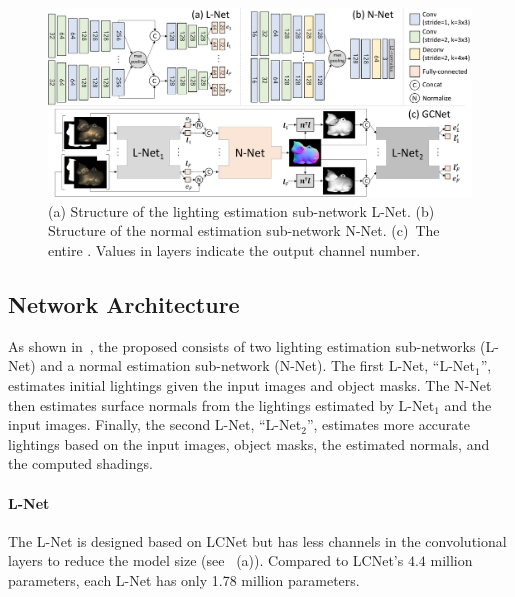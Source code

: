 \begin{figure}[tbp] \centering
	\includegraphics[width=\textwidth]{ch-gcnet/images/Method/PG-LENet_v2}
    \caption[Network architecture of \gcnetacronym]{(a) Structure of the lighting estimation sub-network L-Net. (b) Structure of the normal estimation sub-network N-Net. (c)~The entire \mbox{\gcnetacronym}. Values in layers indicate the output channel number.} \label{fig:netname}
\end{figure}

\subsection{Network Architecture}
As shown in~, the proposed \gcnetacronym consists of two lighting estimation sub-networks (L-Net) and a normal estimation sub-network (N-Net).
The first L-Net, ``L-Net$_1$'', estimates initial lightings given the input images and object masks. 
The N-Net then estimates surface normals from the lightings estimated by L-Net$_1$ and the input images. 
Finally, the second L-Net, ``L-Net$_2$'', estimates more accurate lightings based on the input images, object masks, the estimated normals, and the computed shadings.

\paragraph{L-Net} The L-Net is designed based on LCNet but has less channels in the convolutional layers to reduce the model size (see ~(a)).
Compared to LCNet's $4.4$ million parameters, each L-Net has only \num{1.78} million parameters.


